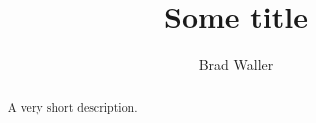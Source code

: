 \documentclass{xourse}
\title{Some title}
\author{Brad Waller}
\begin{document}
\begin{abstract}
  A very short description.
\end{abstract}
\maketitle

\end{document}
